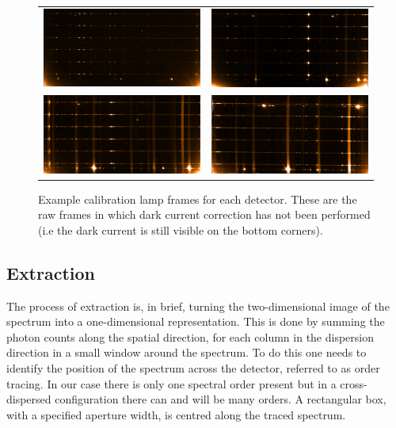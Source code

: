 \begin{figure}
    \begin{tabular}{cc}
         \includegraphics[width=.45\hsize]{./figures/reduction/Thar_1.png} & \includegraphics[width=.45\hsize]{./figures/reduction/Thar_2.png} \\
         \includegraphics[width=.45\hsize]{./figures/reduction/Thar_3.png} & \includegraphics[width=.45\hsize]{./figures/reduction/Thar_4.png} \\
    \end{tabular}

    \caption{Example \thar{} calibration lamp frames for each detector.
        These are the raw frames in which dark current correction has not been performed (i.e the dark current is still visible on the bottom corners).}
    \label{fig:caliblamps}
\end{figure}


\subsection{Extraction}
\label{subsec:extraction}
The process of extraction is, in brief, turning the two-dimensional image of the spectrum into a one-dimensional representation.
This is done by summing the photon counts along the spatial direction, for each column in the dispersion direction in a small window around the spectrum.
To do this one needs to identify the position of the spectrum across the detector, referred to as {order tracing}.
In our case there is only one spectral order present but in a cross-dispersed configuration there can and will be many orders.
A rectangular box, with a specified aperture width, is centred along the traced spectrum.

